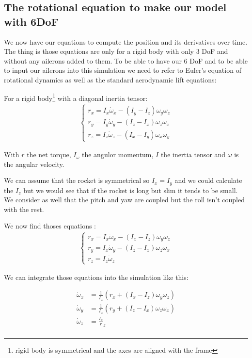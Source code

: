 \subsection{The rotational equation to make our model with 6DoF}
We now have our equations to compute the position and its derivatives over
time. The thing is those equations are only for a rigid body with only 3 DoF
and without any ailerons added to them. To be able to have our 6 DoF and to be
able to input our ailerons into this simulation we need to refer to Euler's
equation of rotational dynamics as well as the standard aerodynamic lift
equations:

For a rigid body\footnote{rigid body is symmetrical and the axes are aligned
    with the frame} with a diagonal inertia tensor:
\begin{gather*}
    \begin{cases}
        r_x = I_x \dot{\omega}_x - (I_y - I_z)\omega_y \omega_z \\
        r_y = I_y \dot{\omega}_y - (I_z - I_x)\omega_z \omega_x \\
        r_z = I_z \dot{\omega}_z - (I_x - I_y)\omega_x \omega_y
    \end{cases}
\end{gather*}

With $r$ the net torque, $I_\omega$ the angulor momentum, $I$ the inertia
tensor and $\omega$ is the angular velocity.

We can assume that the rocket is symmetrical so $I_x=I_y$ and we could
calculate the $I_z$ but we would see that if the rocket is long but slim it
tends to be small. We consider as well that the pitch and yaw are coupled but
the roll isn't coupled with the rest.

We now find thoses equations :
\begin{gather*}
    \begin{cases}
        r_x = I_x \dot{\omega}_x - (I_x - I_z)\omega_y \omega_z \\
        r_y = I_x \dot{\omega}_y - (I_z - I_x)\omega_z \omega_x \\
        r_z = I_z \dot{\omega}_z
    \end{cases}
\end{gather*}

We can integrate those equations into the simulation like this:

\begin{align*}
    \dot{\omega}_x & = \frac{1}{I_x}(r_x + (I_x - I_z)\omega_y \omega_z) \\
    \dot{\omega}_y & = \frac{1}{I_x}(r_y + (I_z - I_x)\omega_z \omega_x) \\
    \dot{\omega}_z & = \frac{I_z}r_z                                     \\
\end{align*}


